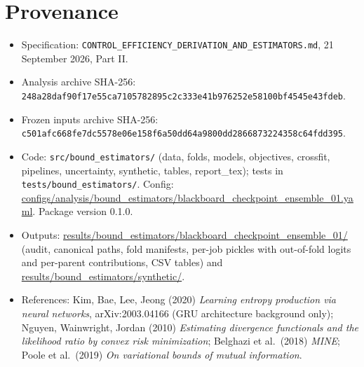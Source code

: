 \documentclass[10pt]{article}
\begin{document}
\section{Provenance}
\begin{itemize}\footnotesize
\item Specification: \texttt{CONTROL\_EFFICIENCY\_DERIVATION\_AND\_ESTIMATORS.md}, 21 September 2026, Part II.
\item Analysis archive SHA-256: \texttt{248a28daf90f17e55ca7105782895c2c333e41b976252e58100bf4545e43fdeb}.
\item Frozen inputs archive SHA-256: \texttt{c501afc668fe7dc5578e06e158f6a50dd64a9800dd2866873224358c64fdd395}.
\item Code: \texttt{src/bound\_estimators/} (data, folds, models, objectives, crossfit, pipelines, uncertainty, synthetic, tables, report\_tex); tests in \texttt{tests/bound\_estimators/}. Config: \url{configs/analysis/bound_estimators/blackboard_checkpoint_ensemble_01.yaml}. Package version 0.1.0.
\item Outputs: \url{results/bound_estimators/blackboard_checkpoint_ensemble_01/} (audit, canonical paths, fold manifests, per-job pickles with out-of-fold logits and per-parent contributions, CSV tables) and \url{results/bound_estimators/synthetic/}.
\item References: Kim, Bae, Lee, Jeong (2020) \emph{Learning entropy production via neural networks}, arXiv:2003.04166 (GRU architecture background only); Nguyen, Wainwright, Jordan (2010) \emph{Estimating divergence functionals and the likelihood ratio by convex risk minimization}; Belghazi et al.\ (2018) \emph{MINE}; Poole et al.\ (2019) \emph{On variational bounds of mutual information}.
\end{itemize}
\end{document}
